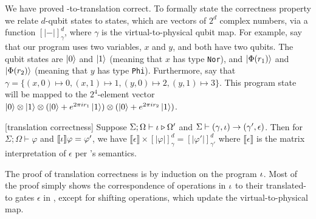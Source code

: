 \newcommand{\transs}[3]{[\!|{#1}|\!]^{#2}_{#3}}

We have proved \oqasm-to-\sqir translation correct. To formally state
the correctness property we relate $d$-qubit \oqasm states to \sqir states, which are vectors of $2^d$ complex numbers, via a function $\transs{-}{d}{\gamma}$, where $\gamma$ is the virtual-to-physical qubit map.
%
For example, say that our program uses two variables, $x$ and $y$, and both have two qubits.
The qubit states are $\left\vert{0}\right\rangle$ and $\left\vert{1}\right\rangle$ (meaning that $x$ has type \texttt{Nor}), and $\left\vert{\Phi(r_1)}\right\rangle$ and $\left\vert{\Phi(r_2)}\right\rangle$ (meaning that $y$ has type \texttt{Phi}).
Furthermore, say that $\gamma = \{(x,0)\mapsto 0,(x,1)\mapsto 1, (y,0)\mapsto 2, (y,1)\mapsto 3\}$. 
This \oqasm program state will be mapped to the $2^4$-element vector $\left\vert{0}\right\rangle\otimes \left\vert{1}\right\rangle\otimes (\left\vert{0}\right\rangle+e^{2\pi i r_1}\left\vert{1}\right\rangle)\otimes (\left\vert{0}\right\rangle+e^{2\pi i r_2}\left\vert{1}\right\rangle)$.


\begin{theorem}\label{thm:vqir-compile}\rm[\oqasm translation correctness]
  Suppose $\Sigma; \Omega \vdash \iota \triangleright \Omega'$ and
  $\Sigma \vdash(\gamma,\iota) \to (\gamma',\epsilon)$. %
Then for $\Sigma; \Omega \vdash \varphi$ and $\llbracket \iota \rrbracket\varphi=\varphi'$, we have 
$\llbracket \epsilon \rrbracket \times \transs{\varphi}{d}{\gamma} = \transs{\varphi'}{d}{\gamma'}$ where $\llbracket \epsilon \rrbracket$ is the matrix interpretation of $\epsilon$ per \sqir's semantics.
\end{theorem}

The proof of translation correctness is by induction on the \oqasm program $\iota$. 
Most of the proof simply shows the correspondence of operations in $\iota$ to their translated-to gates $\epsilon$ in \sqir, except for shifting operations, which update the virtual-to-physical map.

